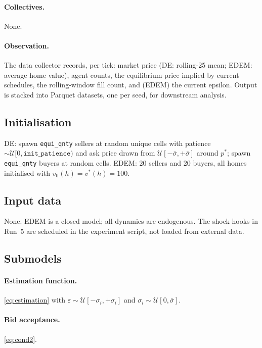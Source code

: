 \paragraph{Collectives.} None.

\paragraph{Observation.} The data collector records, per tick:
market price (DE: rolling-25 mean; EDEM: average home value),
agent counts, the equilibrium price implied by current schedules,
the rolling-window fill count, and (EDEM) the current epsilon.
Output is stacked into Parquet datasets, one per seed, for
downstream analysis.

\subsection{Initialisation}

DE: spawn \texttt{equi\_qnty} sellers at random unique cells with
patience $\sim \mathcal{U}[0, \texttt{init\_patience})$ and ask price
drawn from $\mathcal{U}[-\bar{\sigma}, +\bar{\sigma}]$ around
$p^{*}$; spawn \texttt{equi\_qnty} buyers at random cells.
EDEM: 20 sellers and 20 buyers, all homes initialised with
$v_{0}(h) = v^{*}(h) = 100$.

\subsection{Input data}

None. EDEM is a closed model; all dynamics are endogenous. The shock
hooks in Run~5 are scheduled in the experiment script, not loaded
from external data.

\subsection{Submodels}

\paragraph{Estimation function.} \cref{eq:estimation} with
$\varepsilon \sim \mathcal{U}[-\sigma_{i}, +\sigma_{i}]$ and
$\sigma_{i} \sim \mathcal{U}[0, \bar{\sigma}]$.

\paragraph{Bid acceptance.} \cref{eq:cond2}.


